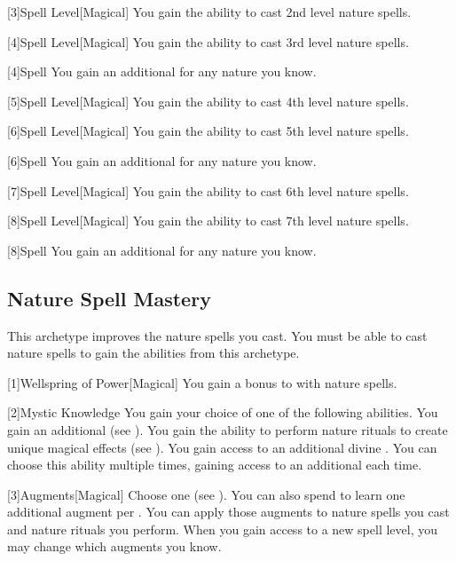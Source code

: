         [3]{Spell Level}[Magical] You gain the ability to cast 2nd level nature spells.

        [4]{Spell Level}[Magical] You gain the ability to cast 3rd level nature spells.

        [4]{Spell} You gain an additional  for any nature  you know.

        [5]{Spell Level}[Magical] You gain the ability to cast 4th level nature spells.

        [6]{Spell Level}[Magical] You gain the ability to cast 5th level nature spells.

        [6]{Spell} You gain an additional  for any nature  you know.

        [7]{Spell Level}[Magical] You gain the ability to cast 6th level nature spells.

        [8]{Spell Level}[Magical] You gain the ability to cast 7th level nature spells.

        [8]{Spell} You gain an additional  for any nature  you know.

    \subsection{Nature Spell Mastery}
        This archetype improves the nature spells you cast.
        You must be able to cast nature spells to gain the abilities from this archetype.

        [1]{Wellspring of Power}[Magical]
        You gain a  bonus to  with nature spells.

        [2]{Mystic Knowledge}
        You gain your choice of one of the following abilities.
        {
             You gain an additional  (see ).
             You gain the ability to perform nature rituals to create unique magical effects (see ).
             You gain access to an additional divine .
                You can choose this ability multiple times, gaining access to an additional  each time.
        }

        [3]{Augments}[Magical]
        Choose one  (see ).
        You can also spend  to learn one additional augment per .
        You can apply those augments to nature spells you cast and nature rituals you perform.
        When you gain access to a new spell level, you may change which augments you know.

